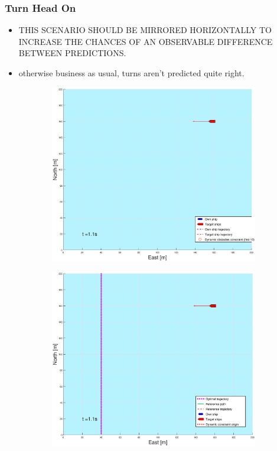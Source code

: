 \subsubsection{Turn Head On}
\begin{itemize}
    \item THIS SCENARIO SHOULD BE MIRRORED HORIZONTALLY TO INCREASE THE CHANCES OF AN OBSERVABLE DIFFERENCE BETWEEN PREDICTIONS.
    \item otherwise business as usual, turns aren't predicted quite right.
\end{itemize}
\clearpage
\begin{figure}[!b] %
    \begin{subfigure}[b]{0.49\textwidth}
        \centering
        \includegraphics[width=\textwidth]{Images/Figures/sving_HO/_Simple_0fig1_time=1}
    \end{subfigure}
    \hfill
    \begin{subfigure}[b]{0.499\textwidth}
        \centering
        \includegraphics[width=\textwidth]{Images/Figures/sving_HO/_Simple_0fig999_time=1}

\end{subfigure}
\end{figure}
